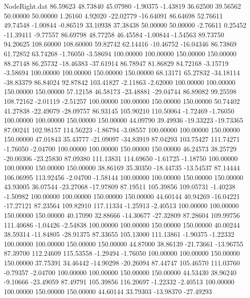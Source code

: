 \begin{filecontents}{NodeRight.dat}
  86.59623   48.73840   45.07980    -1.90375   -1.43819   36.62500   39.56562   50.00000   50.00000    1.26160    4.92020  -22.02779  -16.64091
  86.64698   52.76611   49.74548    -1.00844   -0.86519   33.10938   37.38438   50.00000   50.00000   -2.76611    0.25452  -11.39411   -9.77557
  86.69798   48.77258   46.45584    -1.00844   -1.54563   89.73750   94.20625  108.60000  108.60000   59.82742   62.14416  -10.46752  -16.04346
  86.73869   61.72852   63.74268    -1.76050   -3.58694  100.00000  100.00000  150.00000  150.00000   88.27148   86.25732  -18.46383  -37.61914
  86.78947   81.86829   84.72168    -3.15719   -3.58694  100.00000  100.00000  150.00000  150.00000   68.13171   65.27832  -34.18114  -38.83379
  86.84024   92.87842  103.41827    -2.11863   -2.62000  100.00000  100.00000  150.00000  150.00000   57.12158   46.58173  -23.48881  -29.04744
  86.89082   99.25598  108.72162    -2.01119   -2.51257  100.00000  100.00000  150.00000  150.00000   50.74402   41.27838  -22.49079  -28.09757
  86.93145  105.90210  110.50064    -1.72469   -1.76050  100.00000  100.00000  150.00000  150.00000   44.09790   39.49936  -19.33223  -19.73365
  87.00241  102.98157  114.56223    -1.86794   -3.08557  100.00000  100.00000  150.00000  150.00000   47.01843   35.43777  -21.09097  -34.83919
  87.04293  103.75427  111.74271    -1.76050   -2.04700  100.00000  100.00000  150.00000  150.00000   46.24573   38.25729  -20.00306  -23.25830
  87.09380  111.13831  114.69650    -1.61725   -1.18750  100.00000  100.00000  150.00000  150.00000   38.86169   35.30350  -18.44735  -13.54537
  87.14444  106.06995  113.92456    -2.04700   -1.58144  100.00000  100.00000  150.00000  150.00000   43.93005   36.07544  -23.27068  -17.97809
  87.19511  105.39856  109.05731    -1.40238   -1.50982  100.00000  100.00000  150.00000  150.00000   44.60144   40.94269  -16.04221  -17.27121
  87.23564  109.82910  117.11334    -1.25913   -2.40513  100.00000  100.00000  150.00000  150.00000   40.17090   32.88666  -14.30677  -27.32809
  87.28604  109.99756  111.40686    -1.04426   -2.54838  100.00000  100.00000  150.00000  150.00000   40.00244   38.59314  -11.84805  -28.91375
  87.33655  105.13000  111.13861    -1.90375   -1.22332  100.00000  100.00000  150.00000  150.00000   44.87000   38.86139  -21.73661  -13.96755
  87.39700  112.24609  115.53558    -1.29494   -1.76050  100.00000  100.00000  150.00000  150.00000   37.75391   34.46442  -14.90298  -20.26094
  87.44747  105.46570  111.03760    -0.79357   -2.04700  100.00000  100.00000  150.00000  150.00000   44.53430   38.96240   -9.10666  -23.49059
  87.49791  105.39856  116.20697    -1.22332   -2.40513  100.00000  100.00000  150.00000  150.00000   44.60144   33.79303  -13.98370  -27.49293

\end{filecontents}
